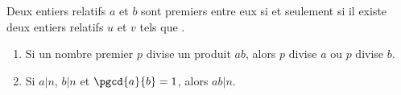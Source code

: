             \begin{thm}
                  Deux entiers relatifs $a$ et $b$ sont premiers entre eux si et seulement si
                  il existe deux entiers relatifs $u$ et $v$ tels que .
            \end{thm}
            \begin{prop}
                  \begin{enumerate}
                        \item Si un nombre premier $p$ divise un produit $ab$, alors $p$ divise $a$ ou $p$ divise $b$.
                        \item Si $a | n$, $b | n$ et $\pgcd{a}{b} = 1$, alors $ab | n$.
                  \end{enumerate}
            \end{prop}
